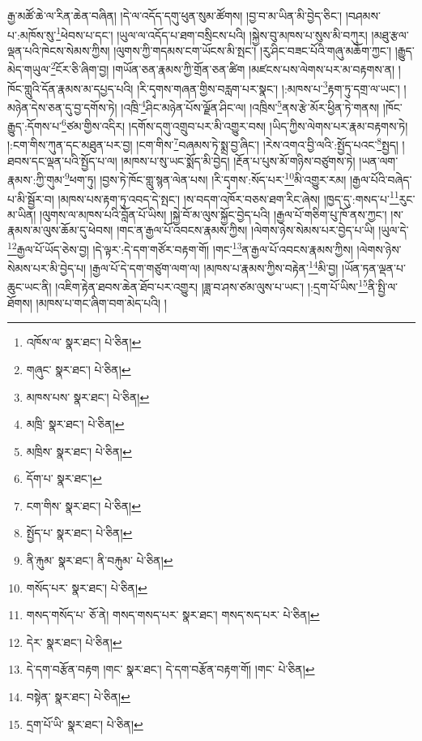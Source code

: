རྒྱ་མཚོ་ཆེ་ལ་རིན་ཆེན་བཞིན། །དེ་ལ་འདོད་དགུ་ཕུན་སུམ་ཚོགས། །བྱ་བ་མ་ཡིན་མི་བྱེད་ཅིང་། །བཤམས་པ་:མཁོས་སུ་\footnote{འཁོས་ལ་  སྣར་ཐང་།  པེ་ཅིན། }ཕེབས་པ་དང་། །ཡུལ་ལ་འདོད་པ་ཐག་བསྲིངས་པའི། །སྐྱེས་བུ་མཁས་པ་སུས་མི་བཀུར། །མཐུ་རྩལ་ལྡན་པའི་ཁེངས་སེམས་ཀྱིས། །ལུགས་ཀྱི་གདམས་ངག་ཡོངས་མི་སྤང་། །རུ་ཤིང་བཟང་པོའི་གཞུ་མཆོག་ཀྱང་། །རྒྱུད་མེད་གཡུལ་\footnote{གཞུང་  སྣར་ཐང་།  པེ་ཅིན། }ངོར་ཅི་ཞིག་བྱ། །གཡོན་ཅན་རྣམས་ཀྱི་གྲོན་ཅན་ཚིག །མཛངས་པས་ལེགས་པར་མ་བརྟགས་ན། །ཁོང་གླུའི་དོན་རྣམས་མ་དཔྱད་པའི། །རི་དྭགས་གཞན་གྱིས་བརླག་པར་སྣང་། །:མཁས་པ་\footnote{མཁས་པས་  སྣར་ཐང་།  པེ་ཅིན། }རྟག་ཏུ་དགྲ་ལ་ཡང་། །མཉེན་དེས་ཅན་དུ་བྱ་དགོས་ཏེ། །འཁྲི་\footnote{མཁྲི་  སྣར་ཐང་།  པེ་ཅིན། }ཤིང་མཉེན་པོས་ལྗོན་ཤིང་ལ། །འཁྲིས་\footnote{མཁྲིས་  སྣར་ཐང་།  པེ་ཅིན། }ནས་རྩེ་མོར་ཕྱིན་ཏེ་གནས། །ཁོང་རྒྱུད་:དོགས་པ་\footnote{དོག་པ་  སྣར་ཐང་། }ཙམ་གྱིས་འདིར། །དགོས་དགུ་འགྲུབ་པར་མི་འགྱུར་བས། །ཡིད་ཀྱིས་ལེགས་པར་རྣམ་བརྟགས་ཏེ། །:ངག་གིས་ཀུན་དང་མཐུན་པར་བྱ། །ངག་གིས་\footnote{ངག་གིས་  སྣར་ཐང་།  པེ་ཅིན། }བཞམས་ཏེ་སྨྲ་བྱ་ཞིང་། །རེས་འགའ་བྱི་ལའི་:སྤྱོད་པའང་\footnote{སྤྱོད་པ་  སྣར་ཐང་།  པེ་ཅིན། }སྤྱད། །ཐབས་དང་ལྡན་པའི་སྤྱོད་པ་ལ། །མཁས་པ་སུ་ཡང་སྨོད་མི་བྱེད། །རྔོན་པ་པུས་མོ་གཉིས་བཙུགས་ཏེ། །ཡན་ལག་རྣམས་:ཀྱི་གུམ་\footnote{ནི་རྐུམ་  སྣར་ཐང་། ནི་བརྐུམ་  པེ་ཅིན། }ཕག་ཏུ། །བྱས་ཏེ་ཁོང་གླུ་སྙན་ལེན་པས། །རི་དྭགས་:སོད་པར་\footnote{གསོད་པར་  སྣར་ཐང་།  པེ་ཅིན། }མི་འགྱུར་རམ། །རྒྱལ་པོའི་བཞེད་པ་མི་སྦྱོར་བ། །མཁས་པས་རྟག་ཏུ་འབད་དེ་སྤང་། །ས་བདག་འཁོར་བཅས་ཐག་རིང་ཞེས། །ཁྱད་དུ་:གསད་པ་\footnote{གསད་གསོད་པ་  ཅོ་ནེ། གསད་གསད་པར་  སྣར་ཐང་། གསད་སད་པར་  པེ་ཅིན། }རུང་མ་ཡིན། །ལུགས་ལ་མཁས་པའི་བློན་པོ་ཡིས། །སྐྱེ་བོ་མ་ལུས་སྐྱོང་བྱེད་པའི། །རྒྱལ་པོ་གཅིག་པུ་ཁོ་ནས་ཀྱང་། །ས་རྣམས་མ་ལུས་ཆོམ་དུ་ཕེབས། །གང་ན་རྒྱལ་པོ་འབངས་རྣམས་ཀྱིས། །ལེགས་ཉེས་སེམས་པར་བྱེད་པ་ཡི། །ཡུལ་དེ་\footnote{དེར་  སྣར་ཐང་།  པེ་ཅིན། }རྒྱལ་པོ་ཡོད་ཅེས་བྱ། །དེ་ལྟར་:དེ་དག་གཙོར་བརྟག་གོ། །གང་\footnote{དེ་དག་བརྩོན་བརྟག །གང་  སྣར་ཐང་། དེ་དག་བརྩོན་བརྟག་གོ། །གང་  པེ་ཅིན། }ན་རྒྱལ་པོ་འབངས་རྣམས་ཀྱིས། །ལེགས་ཉེས་སེམས་པར་མི་བྱེད་པ། །རྒྱལ་པོ་དེ་དག་གཙུག་ལག་ལ། །མཁས་པ་རྣམས་ཀྱིས་བརྟེན་\footnote{བསྟེན་  སྣར་ཐང་།  པེ་ཅིན། }མི་བྱ། །ཡོན་ཏན་ལྡན་པ་ཆུང་ཡང་ནི། །འཇིག་རྟེན་ཐབས་ཆེན་ཐོབ་པར་འགྱུར། །ཟླ་བ་ཤས་ཙམ་ལུས་པ་ཡང་། །:དྲག་པོ་ཡིས་\footnote{དྲག་པོ་ཡི་  སྣར་ཐང་།  པེ་ཅིན། }ནི་སྤྱི་ལ་ཐོགས། །མཁས་པ་གང་ཞིག་བག་མེད་པའི། །
